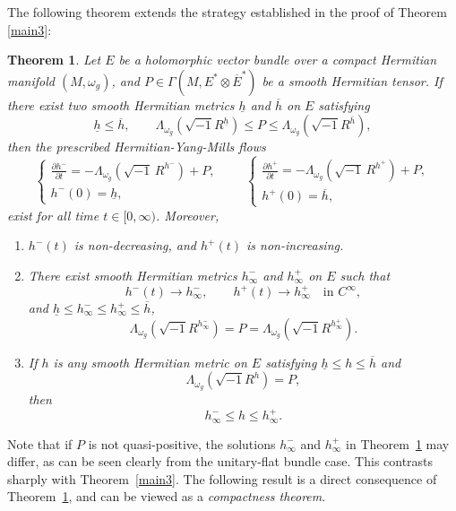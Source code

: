 \documentclass[12pt, reqno]{amsart}
\theoremstyle{plain}
\newtheorem{thm}{Theorem}[section]
\theoremstyle{definition}
\newcommand{\btheorem}{\begin{thm}}
\newcommand{\etheorem}{\end{thm}}
\newcommand{\sq}{\sqrt{-1}}
\renewcommand{\bar}{\overline}
\newcommand{\beq}{\begin{equation}}
\newcommand{\eeq}{\end{equation}}
\newcommand{\bd}{\begin{enumerate}}
\newcommand{\ed}{\end{enumerate}}
\newcommand{\ts}{\otimes}
\renewcommand{\>}{\rightarrow}
\renewcommand{\>}{\rightarrow}
\newcommand{\om}{\omega}
\renewcommand{\bar}{\overline}
\numberwithin{equation}{section} %
\begin{document}
 The following theorem extends the strategy established in the proof of Theorem \ref{main3}:
 \btheorem\label{main4}
  Let  $E$ be a holomorphic vector bundle over a compact Hermitian manifold $(M,\omega_g)$, and  $P\in\Gamma(M,E^*\ts\bar E^*)$ be a smooth Hermitian tensor. If there exist two smooth Hermitian metrics $\underline h$ and $\overline h$ on $E$ satisfying
 \beq
 \underline h\leq\overline h,
 \qquad
 \Lambda_{\omega_g}\left(\sq R^{\underline h}\right)
 \leq P\leq
 \Lambda_{\omega_g}\left(\sq R^{\overline h}\right), 
 \label{monotone barrier assumptions}
 \eeq
 then the prescribed Hermitian-Yang-Mills flows 
 \begin{equation}
 	\label{PHYMF2}
 	\begin{cases}
 		\displaystyle \frac{\partial h^-}{\partial t} = -\Lambda_{\om_g}\left(\sqrt{-1}\, R^{h^-}\right) + P, \\[10pt]
 		h^-(0) =\underline h, 
 \end{cases} \qquad \begin{cases}
 \displaystyle \frac{\partial h^+}{\partial t} = -\Lambda_{\om_g}\left(\sqrt{-1}\, R^{h^+}\right) + P, \\[10pt]
 h^+(0) =\overline h, 
\end{cases}  \end{equation}
 exist for all time $t\in[0,\infty)$. Moreover, \bd \item  $h^-(t)$ is non-decreasing, and $h^+(t)$ is non-increasing. 
 \item There exist smooth Hermitian metrics $h^-_\infty$ and $h^+_\infty$ on $E$ such that
 \beq
 h^-(t)\> h^-_\infty,
 \qquad
 h^+(t)\> h^+_\infty
 \quad\text{in }C^\infty,
 \eeq
 and $
 \underline h\leq h^-_\infty\leq h^+_\infty\leq\overline h$, 
 \beq
 \Lambda_{\omega_g}\left(\sq R^{h^-_\infty}\right)
 =P=
 \Lambda_{\omega_g}\left(\sq R^{h^+_\infty}\right).
 \eeq
\item  If $h$ is any smooth Hermitian metric  on $E$ satisfying $
 \underline h\leq h\leq\overline h$ and
 $$
 \Lambda_{\omega_g}\left(\sq R^h\right)=P,
 $$
 then
 \beq
 h^-_\infty\leq h\leq h^+_\infty.
 \eeq
 \ed 
 \etheorem

\noindent 
Note that if $P$ is not quasi-positive,  the solutions $h_\infty^-$ and $h_\infty^+$ in Theorem~\ref{main4} may differ, as can be seen clearly from the unitary-flat bundle case. This contrasts sharply​ with Theorem~\ref{main3}.
 The following result is a direct consequence of Theorem~\ref{main4}, and can be viewed as a \emph{compactness theorem}.
 
\end{document}

